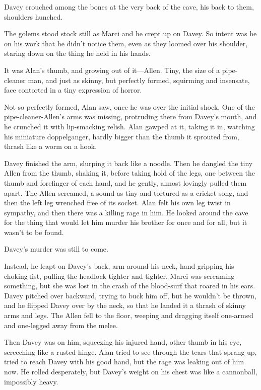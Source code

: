 \documentclass{article}
\begin{document}
Davey crouched among the bones at the very back of the cave, his back
to them, shoulders hunched.

The golems stood stock still as Marci and he crept up on Davey.  So
intent was he on his work that he didn't notice them, even as they
loomed over his shoulder, staring down on the thing he held in his
hands.

It was Alan's thumb, and growing out of it---Allen.  Tiny, the size of
a pipe-cleaner man, and just as skinny, but perfectly formed,
squirming and insensate, face contorted in a tiny expression of
horror.

Not so perfectly formed, Alan saw, once he was over the initial shock. 
One of the pipe-cleaner-Allen's arms was missing, protruding there
from Davey's mouth, and he crunched it with lip-smacking relish.  Alan
gawped at it, taking it in, watching his miniature doppelganger,
hardly bigger than the thumb it sprouted from, thrash like a worm on a
hook.

Davey finished the arm, slurping it back like a noodle.  Then he
dangled the tiny Allen from the thumb, shaking it, before taking hold
of the legs, one between the thumb and forefinger of each hand, and he
gently, almost lovingly pulled them apart.  The Allen screamed, a
sound as tiny and tortured as a cricket song, and then the left leg
wrenched free of its socket.  Alan felt his own leg twist in sympathy,
and then there was a killing rage in him.  He looked around the cave
for the thing that would let him murder his brother for once and for
all, but it wasn't to be found.

Davey's murder was still to come.

Instead, he leapt on Davey's back, arm around his neck, hand gripping
his choking fist, pulling the headlock tighter and tighter.  Marci was
screaming something, but she was lost in the crash of the blood-surf
that roared in his ears.  Davey pitched over backward, trying to buck
him off, but he wouldn't be thrown, and he flipped Davey over by the
neck, so that he landed it a thrash of skinny arms and legs.  The
Allen fell to the floor, weeping and dragging itself one-armed and
one-legged away from the melee.

Then Davey was on him, squeezing his injured hand, other thumb in his
eye, screeching like a rusted hinge.  Alan tried to see through the
tears that sprang up, tried to reach Davey with his good hand, but the
rage was leaking out of him now.  He rolled desperately, but Davey's
weight on his chest was like a cannonball, impossibly heavy.
\end{document}
